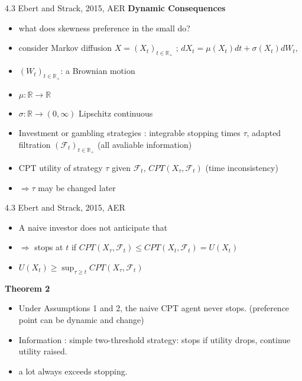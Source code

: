 \documentclass[11pt,aspectratio=169]{beamer}
\begin{document}
\begin{frame}{4.3 Ebert and Strack, 2015, AER}
    \textbf{Dynamic Consequences}\\
    \begin{itemize}
        \item what does skewness preference in the small do?\medskip
        \item consider  Markov diffusion $ X= (X_t)_{t \in \mathbb{R}_+ }$ ; $dX_t = \mu(X_t)dt + \sigma (X_t)dW_t $,\medskip
        \item $(W_t)_{t \in \mathbb{R}_+ }$: a Brownian motion\medskip
        \item $\mu:\mathbb{R} \rightarrow \mathbb{R} $ \medskip
        \item $\sigma : \mathbb{R}  \rightarrow (0,\infty) $ Lipschitz continuous\medskip
        \item Investment or gambling strategies : integrable stopping times $\tau $, adapted filtration $(\mathcal{F} _t)_{t \in \mathbb{R}_+ } $ (all avaliable information)\medskip
        \item CPT utility of strategy $\tau$ given $\mathcal{F} _t$, $CPT(X_\tau,\mathcal{F}_t)$ (time inconsistency)\medskip
        \item $\Rightarrow \tau$ may be changed later\medskip
       	\end{itemize}
\end{frame}


\begin{frame}{4.3 Ebert and Strack, 2015, AER}
    \begin{itemize}
        \item A naive investor does not anticipate that\medskip
        \item $\Rightarrow$ stops at $t$ if  $CPT(X_\tau,\mathcal{F}_t) \leq CPT(X_t,\mathcal{F}_t)=U(X_t) $\medskip
        \item $U(X_t) \geq \sup_{\tau \geq t} CPT(X_\tau,\mathcal{F}_t)$
    \end{itemize}
 \textbf{Theorem 2}\\
    \begin{itemize}
        \item Under Assumptions 1 and 2, the naive CPT agent never stops. (preference point can be dynamic and change)\medskip
        \item Information : simple two-threshold strategy: stops if utility drops, continue utility raised.\medskip
        \item a lot always exceeds stopping.\medskip
	\end{itemize}
\end{frame}
\end{document}
